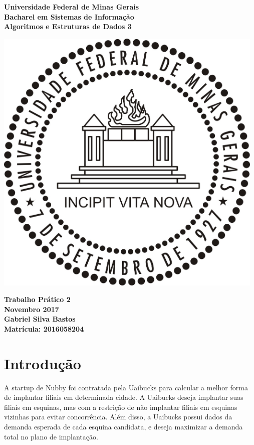 \documentclass{article}
\begin{document}
\begin{titlepage}
  \centering
  
  \vfill{
    \bfseries\Huge
    Universidade Federal de Minas Gerais\\[5pt]
    \bfseries\Large
    Bacharel em Sistemas de Informação \\
    Algoritmos e Estruturas de Dados 3\\
  }
  
  \vfill
  
  \includegraphics[width=13cm]{images/ufmg_logo.jpg}
  
  \vfill{
    \bfseries\Large
    Trabalho Prático 2\\
    Novembro 2017\\
  }
  \vfill{
    \bfseries\large
    Gabriel Silva Bastos\\[5pt]
    Matrícula: 2016058204
  }
\end{titlepage}


\section{Introdução}
A startup de Nubby foi contratada pela Uaibucks para calcular a melhor forma de implantar filiais em determinada cidade. A Uaibucks deseja implantar suas filiais em esquinas, mas com a restrição de não implantar filiais em esquinas vizinhas para evitar concorrência. Além disso, a Uaibucks possui dados da demanda esperada de cada esquina candidata, e deseja maximizar a demanda total no plano de implantação.
\end{document}
